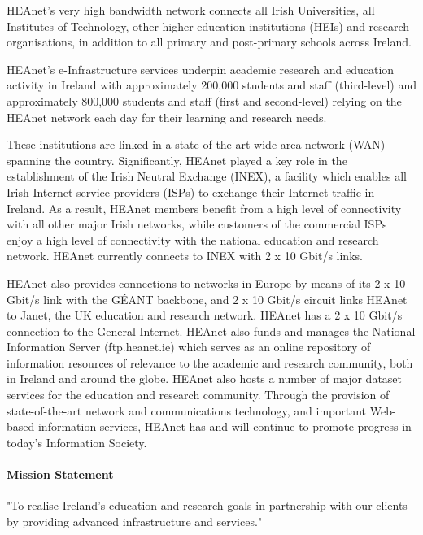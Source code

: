 \documentclass{article}
\begin{document}
HEAnet's very high bandwidth network connects all Irish Universities, all Institutes of Technology, other higher education institutions (HEIs) and research organisations, in addition to all primary and post-primary schools across Ireland.

HEAnet's e-Infrastructure services underpin academic research and education activity in Ireland with approximately 200,000 students and staff (third-level) and approximately 800,000 students and staff (first and second-level) relying on the HEAnet network each day for their learning and research needs.

These institutions are linked in a state-of-the art wide area network (WAN) spanning the country. Significantly, HEAnet played a key role in the establishment of the Irish Neutral Exchange (INEX), a facility which enables all Irish Internet service providers (ISPs) to exchange their Internet traffic in Ireland. As a result, HEAnet members benefit from a high level of connectivity with all other major Irish networks, while customers of the commercial ISPs enjoy a high level of connectivity with the national education and research network. HEAnet currently connects to INEX with 2 x 10 Gbit/s links.

HEAnet also provides connections to networks in Europe by means of its 2 x 10 Gbit/s link with the GÉANT backbone, and 2 x 10 Gbit/s circuit links HEAnet to Janet, the UK education and research network. HEAnet has a 2 x 10 Gbit/s connection to the General Internet. HEAnet also funds and manages the National Information Server (ftp.heanet.ie) which serves as an online repository of information resources of relevance to the academic and research community, both in Ireland and around the globe. HEAnet also hosts a number of major dataset services for the education and research community. Through the provision of state-of-the-art network and communications technology, and important Web-based information services, HEAnet has and will continue to promote progress in today's Information Society.

\paragraph{Mission Statement}
"To realise Ireland's education and research goals in partnership with our clients by providing advanced infrastructure and services."
\end{document}
